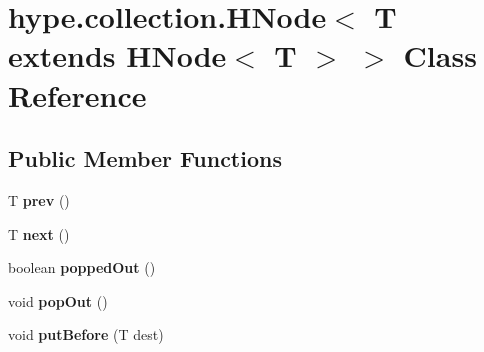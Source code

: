\hypertarget{classhype_1_1collection_1_1_h_node_3_01_t_01extends_01_h_node_3_01_t_01_4_01_4}{\section{hype.\-collection.\-H\-Node$<$ T extends H\-Node$<$ T $>$ $>$ Class Reference}
\label{classhype_1_1collection_1_1_h_node_3_01_t_01extends_01_h_node_3_01_t_01_4_01_4}
}
\subsection*{Public Member Functions}
\begin{DoxyCompactItemize}
\item 
\hypertarget{classhype_1_1collection_1_1_h_node_3_01_t_01extends_01_h_node_3_01_t_01_4_01_4_aae8ccc3adcc37e8a76c3cc9c8c547704}{T {\bfseries prev} ()}\label{classhype_1_1collection_1_1_h_node_3_01_t_01extends_01_h_node_3_01_t_01_4_01_4_aae8ccc3adcc37e8a76c3cc9c8c547704}

\item 
\hypertarget{classhype_1_1collection_1_1_h_node_3_01_t_01extends_01_h_node_3_01_t_01_4_01_4_a41263a2eb30234e80b1cc6bcc55a2b04}{T {\bfseries next} ()}\label{classhype_1_1collection_1_1_h_node_3_01_t_01extends_01_h_node_3_01_t_01_4_01_4_a41263a2eb30234e80b1cc6bcc55a2b04}

\item 
\hypertarget{classhype_1_1collection_1_1_h_node_3_01_t_01extends_01_h_node_3_01_t_01_4_01_4_a330b060302135fb8f26dbb6fd78a13c0}{boolean {\bfseries popped\-Out} ()}\label{classhype_1_1collection_1_1_h_node_3_01_t_01extends_01_h_node_3_01_t_01_4_01_4_a330b060302135fb8f26dbb6fd78a13c0}

\item 
\hypertarget{classhype_1_1collection_1_1_h_node_3_01_t_01extends_01_h_node_3_01_t_01_4_01_4_a3165490a430113a73ed823954d1dd25d}{void {\bfseries pop\-Out} ()}\label{classhype_1_1collection_1_1_h_node_3_01_t_01extends_01_h_node_3_01_t_01_4_01_4_a3165490a430113a73ed823954d1dd25d}

\item 
\hypertarget{classhype_1_1collection_1_1_h_node_3_01_t_01extends_01_h_node_3_01_t_01_4_01_4_ac9220d1f8393686b5104df6f4da8e4be}{void {\bfseries put\-Before} (T dest)}\label{classhype_1_1collection_1_1_h_node_3_01_t_01extends_01_h_node_3_01_t_01_4_01_4_ac9220d1f8393686b5104df6f4da8e4be}


\end{DoxyCompactItemize}
